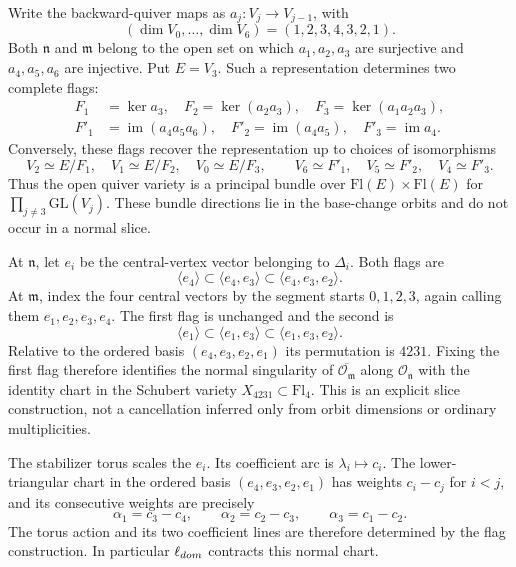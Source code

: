 \documentclass[10pt,a4paper]{amsart}
\begin{document}
Write the backward-quiver maps as $a_j:V_j\to V_{j-1}$, with
\[
 (\dim V_0,\ldots,\dim V_6)=(1,2,3,4,3,2,1).
\]
Both $\mathfrak n$ and $\mathfrak m$ belong to the open set on which
$a_1,a_2,a_3$ are surjective and $a_4,a_5,a_6$ are injective.
Put $E=V_3$.  Such a representation determines two complete flags:
\[
 \begin{split}
 F_1&=\ker a_3,\quad
 F_2=\ker(a_2a_3),\quad
 F_3=\ker(a_1a_2a_3),\\
 F'_1&=\operatorname{im}(a_4a_5a_6),\quad
 F'_2=\operatorname{im}(a_4a_5),\quad
 F'_3=\operatorname{im}a_4.
 \end{split}
\]
Conversely, these flags recover the representation up to choices of
isomorphisms
\[
 V_2\simeq E/F_1,\quad V_1\simeq E/F_2,\quad V_0\simeq E/F_3,
 \qquad
 V_6\simeq F'_1,\quad V_5\simeq F'_2,\quad V_4\simeq F'_3.
\]
Thus the open quiver variety is a principal bundle over
$\mathrm{Fl}(E)\times\mathrm{Fl}(E)$ for
$\prod_{j\ne3}\mathrm{GL}(V_j)$.  These bundle directions lie in the
base-change orbits and do not occur in a normal slice.

At $\mathfrak n$, let $e_i$ be the central-vertex vector belonging to
$\Delta_i$.  Both flags are
\[
 \langle e_4\rangle
 \subset\langle e_4,e_3\rangle
 \subset\langle e_4,e_3,e_2\rangle.
\]
At $\mathfrak m$, index the four central vectors by the segment starts
$0,1,2,3$, again calling them $e_1,e_2,e_3,e_4$.
The first flag is unchanged and the second is
\[
 \langle e_1\rangle
 \subset\langle e_1,e_3\rangle
 \subset\langle e_1,e_3,e_2\rangle.
\]
Relative to the ordered basis $(e_4,e_3,e_2,e_1)$ its permutation is
$4231$.  Fixing the first flag therefore identifies the normal
singularity of $\overline{\mathcal O_{\mathfrak m}}$ along
$\mathcal O_{\mathfrak n}$ with the identity chart in the Schubert
variety $X_{4231}\subset\mathrm{Fl}_4$.
This is an explicit slice construction, not a cancellation inferred
only from orbit dimensions or ordinary multiplicities.

The stabilizer torus scales the $e_i$.  Its coefficient arc is
$\lambda_i\mapsto c_i$.  The lower-triangular chart in the ordered
basis $(e_4,e_3,e_2,e_1)$ has weights
$c_i-c_j$ for $i<j$, and its consecutive weights are precisely
\[
 \alpha_1=c_3-c_4,\qquad
 \alpha_2=c_2-c_3,\qquad
 \alpha_3=c_1-c_2.
\]
The torus action and its two coefficient lines are therefore determined
by the flag construction.  In particular $\ell_{\rm dom}$ contracts
this normal chart.
\end{document}
